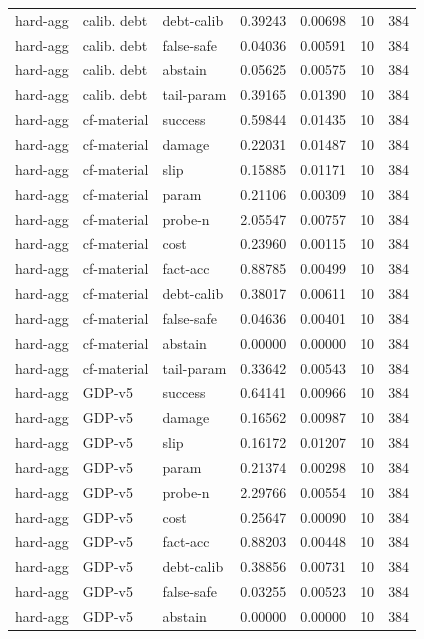 \documentclass{article}
\begin{document}
\begin{center}
\begin{longtable}{lllllll}
hard-agg & calib. debt & debt-calib & 0.39243 & 0.00698 & 10 & 384 \\
hard-agg & calib. debt & false-safe & 0.04036 & 0.00591 & 10 & 384 \\
hard-agg & calib. debt & abstain & 0.05625 & 0.00575 & 10 & 384 \\
hard-agg & calib. debt & tail-param & 0.39165 & 0.01390 & 10 & 384 \\
hard-agg & cf-material & success & 0.59844 & 0.01435 & 10 & 384 \\
hard-agg & cf-material & damage & 0.22031 & 0.01487 & 10 & 384 \\
hard-agg & cf-material & slip & 0.15885 & 0.01171 & 10 & 384 \\
hard-agg & cf-material & param & 0.21106 & 0.00309 & 10 & 384 \\
hard-agg & cf-material & probe-n & 2.05547 & 0.00757 & 10 & 384 \\
hard-agg & cf-material & cost & 0.23960 & 0.00115 & 10 & 384 \\
hard-agg & cf-material & fact-acc & 0.88785 & 0.00499 & 10 & 384 \\
hard-agg & cf-material & debt-calib & 0.38017 & 0.00611 & 10 & 384 \\
hard-agg & cf-material & false-safe & 0.04636 & 0.00401 & 10 & 384 \\
hard-agg & cf-material & abstain & 0.00000 & 0.00000 & 10 & 384 \\
hard-agg & cf-material & tail-param & 0.33642 & 0.00543 & 10 & 384 \\
hard-agg & GDP-v5 & success & 0.64141 & 0.00966 & 10 & 384 \\
hard-agg & GDP-v5 & damage & 0.16562 & 0.00987 & 10 & 384 \\
hard-agg & GDP-v5 & slip & 0.16172 & 0.01207 & 10 & 384 \\
hard-agg & GDP-v5 & param & 0.21374 & 0.00298 & 10 & 384 \\
hard-agg & GDP-v5 & probe-n & 2.29766 & 0.00554 & 10 & 384 \\
hard-agg & GDP-v5 & cost & 0.25647 & 0.00090 & 10 & 384 \\
hard-agg & GDP-v5 & fact-acc & 0.88203 & 0.00448 & 10 & 384 \\
hard-agg & GDP-v5 & debt-calib & 0.38856 & 0.00731 & 10 & 384 \\
hard-agg & GDP-v5 & false-safe & 0.03255 & 0.00523 & 10 & 384 \\
hard-agg & GDP-v5 & abstain & 0.00000 & 0.00000 & 10 & 384 \\

\end{longtable}
\end{center}
\end{document}
